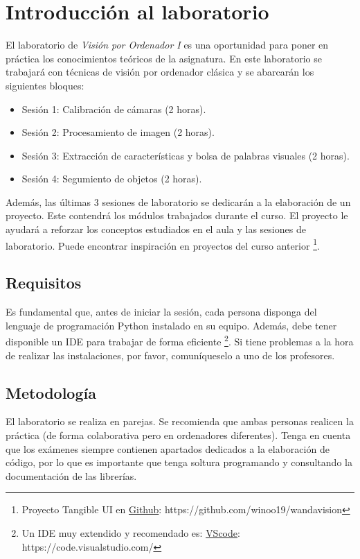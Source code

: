 \chapter{Introducción al laboratorio}
\label{chapter:introduction_lab}

El laboratorio de \textit{Visión por Ordenador I} es una oportunidad para poner en práctica los conocimientos teóricos de la asignatura. En este laboratorio se trabajará con técnicas de visión por ordenador clásica y se abarcarán los siguientes bloques: 

\begin{itemize}
    \item Sesión 1: Calibración de cámaras (2 horas).
    \item Sesión 2: Procesamiento de imagen (2 horas).
    \item Sesión 3: Extracción de características y bolsa de palabras visuales (2 horas).
    \item Sesión 4: Segumiento de objetos (2 horas).
\end{itemize}

Además, las últimas 3 sesiones de laboratorio se dedicarán a la elaboración de un proyecto. Este contendrá los módulos trabajados durante el curso. El proyecto le ayudará a reforzar los conceptos estudiados en el aula y las sesiones de laboratorio. Puede encontrar inspiración en proyectos del curso anterior \footnote{Proyecto Tangible UI en \href{https://github.com/winoo19/wandavision}{Github}: https://github.com/winoo19/wandavision}.


\section{Requisitos}
Es fundamental que, antes de iniciar la sesión, cada persona disponga del lenguaje de programación Python instalado en su equipo. Además, debe tener disponible un IDE para trabajar de forma eficiente \footnote{Un IDE muy extendido y recomendado es: \href{https://code.visualstudio.com/}{VScode}: https://code.visualstudio.com/}. Si tiene problemas a la hora de realizar las instalaciones, por favor, comuníqueselo a uno de los profesores.

\section{Metodología}
El laboratorio se realiza en parejas. Se recomienda que ambas personas realicen la práctica (de forma colaborativa pero en ordenadores diferentes). Tenga en cuenta que los exámenes siempre contienen apartados dedicados a la elaboración de código, por lo que es importante que tenga soltura programando y consultando la documentación de las librerías. 


